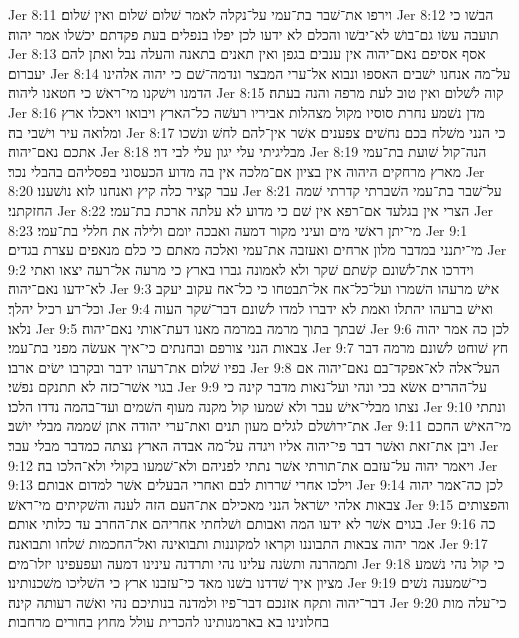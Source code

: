 Jer 8:11  וירפו את־שׁבר בת־עמי על־נקלה לאמר שׁלום שׁלום ואין שׁלום׃
Jer 8:12  הבשׁו כי תועבה עשׂו גם־בושׁ לא־יבשׁו והכלם לא ידעו לכן יפלו בנפלים בעת פקדתם יכשׁלו אמר יהוה׃
Jer 8:13  אסף אסיפם נאם־יהוה אין ענבים בגפן ואין תאנים בתאנה והעלה נבל ואתן להם יעברום׃
Jer 8:14  על־מה אנחנו ישׁבים האספו ונבוא אל־ערי המבצר ונדמה־שׁם כי יהוה אלהינו הדמנו וישׁקנו מי־ראשׁ כי חטאנו ליהוה׃
Jer 8:15  קוה לשׁלום ואין טוב לעת מרפה והנה בעתה׃
Jer 8:16  מדן נשׁמע נחרת סוסיו מקול מצהלות אביריו רעשׁה כל־הארץ ויבואו ויאכלו ארץ ומלואה עיר וישׁבי בה׃
Jer 8:17  כי הנני משׁלח בכם נחשׁים צפענים אשׁר אין־להם לחשׁ ונשׁכו אתכם נאם־יהוה׃
Jer 8:18  מבליגיתי עלי יגון עלי לבי דוי׃
Jer 8:19  הנה־קול שׁועת בת־עמי מארץ מרחקים היהוה אין בציון אם־מלכה אין בה מדוע הכעסוני בפסליהם בהבלי נכר׃
Jer 8:20  עבר קציר כלה קיץ ואנחנו לוא נושׁענו׃
Jer 8:21  על־שׁבר בת־עמי השׁברתי קדרתי שׁמה החזקתני׃
Jer 8:22  הצרי אין בגלעד אם־רפא אין שׁם כי מדוע לא עלתה ארכת בת־עמי׃
Jer 8:23  מי־יתן ראשׁי מים ועיני מקור דמעה ואבכה יומם ולילה את חללי בת־עמי׃
Jer 9:1  מי־יתנני במדבר מלון ארחים ואעזבה את־עמי ואלכה מאתם כי כלם מנאפים עצרת בגדים׃
Jer 9:2  וידרכו את־לשׁונם קשׁתם שׁקר ולא לאמונה גברו בארץ כי מרעה אל־רעה יצאו ואתי לא־ידעו נאם־יהוה׃
Jer 9:3  אישׁ מרעהו השׁמרו ועל־כל־אח אל־תבטחו כי כל־אח עקוב יעקב וכל־רע רכיל יהלך׃
Jer 9:4  ואישׁ ברעהו יהתלו ואמת לא ידברו למדו לשׁונם דבר־שׁקר העוה נלאו׃
Jer 9:5  שׁבתך בתוך מרמה במרמה מאנו דעת־אותי נאם־יהוה׃
Jer 9:6  לכן כה אמר יהוה צבאות הנני צורפם ובחנתים כי־איך אעשׂה מפני בת־עמי׃
Jer 9:7  חץ שׁוחט לשׁונם מרמה דבר בפיו שׁלום את־רעהו ידבר ובקרבו ישׂים ארבו׃
Jer 9:8  העל־אלה לא־אפקד־בם נאם־יהוה אם בגוי אשׁר־כזה לא תתנקם נפשׁי׃
Jer 9:9  על־ההרים אשׂא בכי ונהי ועל־נאות מדבר קינה כי נצתו מבלי־אישׁ עבר ולא שׁמעו קול מקנה מעוף השׁמים ועד־בהמה נדדו הלכו׃
Jer 9:10  ונתתי את־ירושׁלם לגלים מעון תנים ואת־ערי יהודה אתן שׁממה מבלי יושׁב׃
Jer 9:11  מי־האישׁ החכם ויבן את־זאת ואשׁר דבר פי־יהוה אליו ויגדה על־מה אבדה הארץ נצתה כמדבר מבלי עבר׃
Jer 9:12  ויאמר יהוה על־עזבם את־תורתי אשׁר נתתי לפניהם ולא־שׁמעו בקולי ולא־הלכו בה׃
Jer 9:13  וילכו אחרי שׁררות לבם ואחרי הבעלים אשׁר למדום אבותם׃
Jer 9:14  לכן כה־אמר יהוה צבאות אלהי ישׂראל הנני מאכילם את־העם הזה לענה והשׁקיתים מי־ראשׁ׃
Jer 9:15  והפצותים בגוים אשׁר לא ידעו המה ואבותם ושׁלחתי אחריהם את־החרב עד כלותי אותם׃
Jer 9:16  כה אמר יהוה צבאות התבוננו וקראו למקוננות ותבואינה ואל־החכמות שׁלחו ותבואנה׃
Jer 9:17  ותמהרנה ותשׂנה עלינו נהי ותרדנה עינינו דמעה ועפעפינו יזלו־מים׃
Jer 9:18  כי קול נהי נשׁמע מציון איך שׁדדנו בשׁנו מאד כי־עזבנו ארץ כי השׁליכו משׁכנותינו׃
Jer 9:19  כי־שׁמענה נשׁים דבר־יהוה ותקח אזנכם דבר־פיו ולמדנה בנותיכם נהי ואשׁה רעותה קינה׃
Jer 9:20  כי־עלה מות בחלונינו בא בארמנותינו להכרית עולל מחוץ בחורים מרחבות׃
